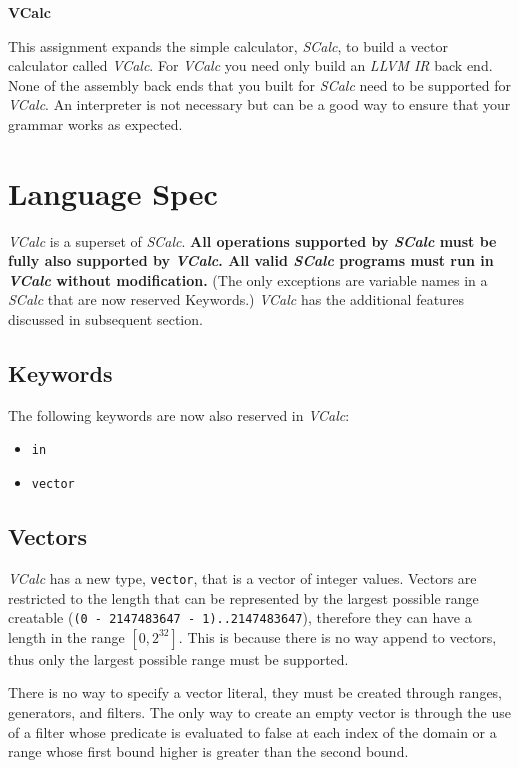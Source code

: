 \documentclass{article}
\newcommand{\code}[1]{\texttt{\textmd{#1}}}
\begin{document}
\ifpdf
  \LARGE
  \textbf{VCalc}
  \normalsize
\fi


This assignment expands the simple calculator, \textit{SCalc}, to build a vector calculator called
\textit{VCalc}. For \textit{VCalc} you need only build an \textit{LLVM IR} back end. None of the
assembly back ends that you built for \textit{SCalc} need to be supported for \textit{VCalc}. An
interpreter is not necessary but can be a good way to ensure that your grammar works as expected.

\section{Language Spec}
\textit{VCalc} is a superset of \textit{SCalc}. \textbf{All operations supported by \textit{SCalc}
must be fully also supported by \textit{VCalc}. All valid \textit{SCalc} programs must run in
\textit{VCalc} without modification.} (The only exceptions are variable names in a \textit{SCalc}
that are now reserved Keywords.) \textit{VCalc} has the additional features discussed in subsequent
section.

\subsection{Keywords}
The following keywords are now also reserved in \textit{VCalc}:
\begin{itemize}
  \item \code{in}
  \item \code{vector}
\end{itemize}

\subsection{Vectors}
\textit{VCalc} has a new type, \code{vector}, that is a vector of integer values. Vectors are
restricted to the length that can be represented by the largest possible range creatable
(\code{(0 - 2147483647 - 1)..2147483647}), therefore they can have a length in the range
$[0, 2^{32}]$. This is because there is no way append to vectors, thus only the largest possible
range must be supported.

There is no way to specify a vector literal, they must be created through ranges, generators, and
filters. The only way to create an empty vector is through the use of a filter whose predicate is
evaluated to false at each index of the domain or a range whose first bound higher is greater  than
the second bound.
\end{document}
